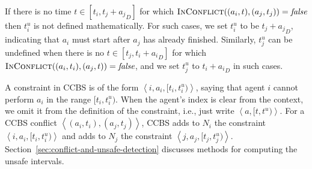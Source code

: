 \documentclass[review]{elsarticle}
\newcommand{\tuple}[1]{\ensuremath{\left \langle #1 \right \rangle }}
\newcommand\konstantin[1]{\nb{\textbf{Konstantin:}}{red}{#1}}
\newcommand\roni[1]{\nb{\textbf{Roni:}}{green}{#1}}
\newcommand{\ccbs}{\ac{CCBS}\xspace}
\newcommand{\false}{\textit{false}\xspace}
\newcommand{\inconflict}{\textsc{InConflict}\xspace}
\begin{document}
If there is no time $t\in[t_i,t_j+{a_j}_D]$ for which $\inconflict((a_i,t),(a_j,t_j))=\false$ then $t_i^u$ is not defined mathematically. 
For such cases, we set $t_i^u$ to be $t_j+{a_j}_D$, indicating that $a_i$ must start after $a_j$ has already finished. Similarly, 
$t_j^u$ can be undefined 
when there is no 
$t\in[t_j,t_i+{a_i}_D]$ for which $\inconflict((a_i,t_i),(a_j,t))=\false$, 
and we set $t_j^u$ to $t_i+{a_i}_D$ in such cases. 

A constraint in \ccbs is of the form $\tuple{i, a_i, [t_i, t^u_i)}$, saying that agent $i$ cannot perform $a_i$ in the range $[t_i,t^u_i)$. When the agent's index is clear from the context, we omit it from the definition of the constraint, i.e., just write $\tuple{a, [t,t^u)}$. 
For a \ccbs conflict $\tuple{(a_i, t_i), (a_j, t_j)}$, \ccbs adds to $N_i$ the constraint $\tuple{i, a_i, [t_i,t^u_i)}$ and adds to $N_j$ the constraint $\tuple{j, a_j, [t_j,t^u_j)}$. 
Section~\ref{sec:conflict-and-unsafe-detection} discusses methods for computing the unsafe intervals. 
\end{document}

